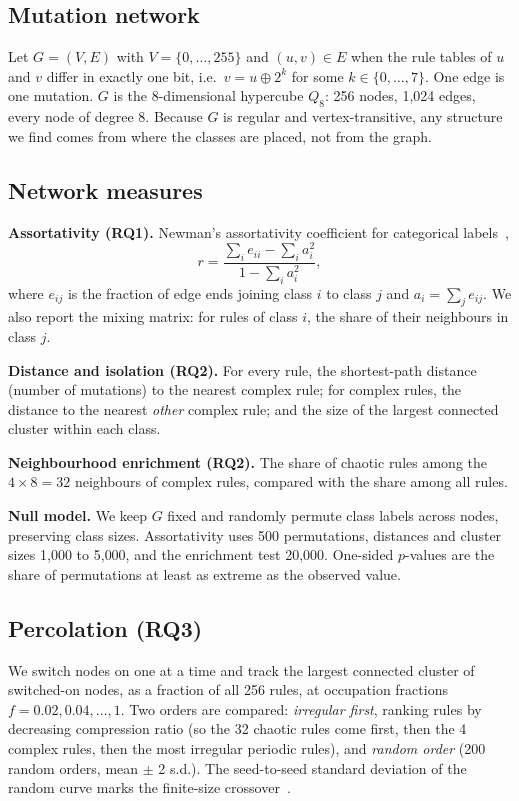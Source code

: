 \documentclass[10pt,letterpaper,twocolumn]{article}
\newcommand{\para}[1]{\textbf{#1}\hspace{0.4em}}
\begin{document}
\subsection{Mutation network}
Let $G=(V,E)$ with $V=\{0,\dots,255\}$ and $(u,v)\in E$ when the rule tables of $u$ and $v$ differ in exactly one bit, i.e.\ $v = u \oplus 2^k$ for some $k\in\{0,\dots,7\}$. One edge is one mutation. $G$ is the 8-dimensional hypercube $Q_8$: 256 nodes, 1{,}024 edges, every node of degree 8. Because $G$ is regular and vertex-transitive, any structure we find comes from where the classes are placed, not from the graph.

\subsection{Network measures}
\para{Assortativity (RQ1).} Newman's assortativity coefficient for categorical labels~\cite{newman2003},
\begin{equation}
r = \frac{\sum_i e_{ii} - \sum_i a_i^2}{1 - \sum_i a_i^2},
\end{equation}
where $e_{ij}$ is the fraction of edge ends joining class $i$ to class $j$ and $a_i=\sum_j e_{ij}$. We also report the mixing matrix: for rules of class $i$, the share of their neighbours in class $j$.

\para{Distance and isolation (RQ2).} For every rule, the shortest-path distance (number of mutations) to the nearest complex rule; for complex rules, the distance to the nearest \emph{other} complex rule; and the size of the largest connected cluster within each class.

\para{Neighbourhood enrichment (RQ2).} The share of chaotic rules among the $4\times 8 = 32$ neighbours of complex rules, compared with the share among all rules.

\para{Null model.} We keep $G$ fixed and randomly permute class labels across nodes, preserving class sizes. Assortativity uses 500 permutations, distances and cluster sizes 1{,}000 to 5{,}000, and the enrichment test 20{,}000. One-sided $p$-values are the share of permutations at least as extreme as the observed value.

\subsection{Percolation (RQ3)}
We switch nodes on one at a time and track the largest connected cluster of switched-on nodes, as a fraction of all 256 rules, at occupation fractions $f = 0.02, 0.04, \dots, 1$. Two orders are compared: \emph{irregular first}, ranking rules by decreasing compression ratio (so the 32 chaotic rules come first, then the 4 complex rules, then the most irregular periodic rules), and \emph{random order} (200 random orders, mean $\pm$ 2 s.d.). The seed-to-seed standard deviation of the random curve marks the finite-size crossover~\cite{stauffer1994}.
\end{document}
